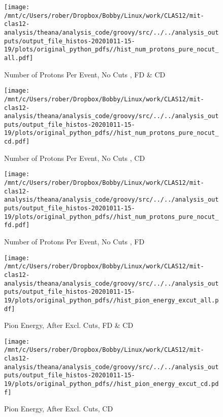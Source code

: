 \documentclass{article}
\begin{document}
\begin{landscape}
    \begin{figure}[h]
        \centering

        \texttt{[image: /mnt/c/Users/rober/Dropbox/Bobby/Linux/work/CLAS12/mit-clas12-analysis/theana/analysis\_code/groovy/src/../../analysis\_outputs/output\_file\_histos-20201011-15-19/plots/original\_python\_pdfs//hist\_num\_protons\_pure\_nocut\_all.pdf]}
        \captionsetup{textformat=empty,labelformat=blank}
        \caption{Number of Protons Per Event, No Cuts , FD \& CD}
    \end{figure}
    \clearpage
    
    \begin{figure}[h]
        \centering

        \texttt{[image: /mnt/c/Users/rober/Dropbox/Bobby/Linux/work/CLAS12/mit-clas12-analysis/theana/analysis\_code/groovy/src/../../analysis\_outputs/output\_file\_histos-20201011-15-19/plots/original\_python\_pdfs//hist\_num\_protons\_pure\_nocut\_cd.pdf]}
        \captionsetup{textformat=empty,labelformat=blank}
        \caption{Number of Protons Per Event, No Cuts , CD}
    \end{figure}
    \clearpage
    
    \begin{figure}[h]
        \centering

        \texttt{[image: /mnt/c/Users/rober/Dropbox/Bobby/Linux/work/CLAS12/mit-clas12-analysis/theana/analysis\_code/groovy/src/../../analysis\_outputs/output\_file\_histos-20201011-15-19/plots/original\_python\_pdfs//hist\_num\_protons\_pure\_nocut\_fd.pdf]}
        \captionsetup{textformat=empty,labelformat=blank}
        \caption{Number of Protons Per Event, No Cuts , FD}
    \end{figure}
    \clearpage
    
    \begin{figure}[h]
        \centering

        \texttt{[image: /mnt/c/Users/rober/Dropbox/Bobby/Linux/work/CLAS12/mit-clas12-analysis/theana/analysis\_code/groovy/src/../../analysis\_outputs/output\_file\_histos-20201011-15-19/plots/original\_python\_pdfs//hist\_pion\_energy\_excut\_all.pdf]}
        \captionsetup{textformat=empty,labelformat=blank}
        \caption{Pion Energy, After Excl. Cuts, FD \& CD}
    \end{figure}
    \clearpage
    
    \begin{figure}[h]
        \centering

        \texttt{[image: /mnt/c/Users/rober/Dropbox/Bobby/Linux/work/CLAS12/mit-clas12-analysis/theana/analysis\_code/groovy/src/../../analysis\_outputs/output\_file\_histos-20201011-15-19/plots/original\_python\_pdfs//hist\_pion\_energy\_excut\_cd.pdf]}
        \captionsetup{textformat=empty,labelformat=blank}
        \caption{Pion Energy, After Excl. Cuts, CD}
    \end{figure}
    \clearpage
    

\end{landscape}
\end{document}
